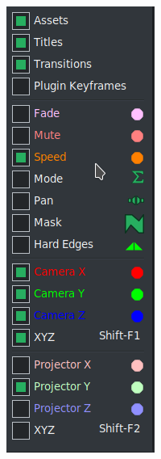 \begin{figure}[htpb]
    \begin{minipage}{.29\linewidth}
        \centering
        \includegraphics[width=0.99\linewidth]{images/overlays_list1.png}

\end{minipage}
\end{figure}
